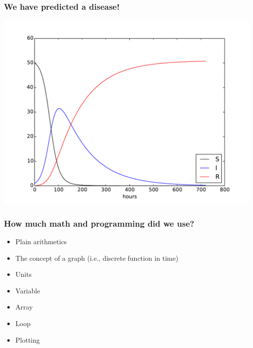 \documentclass{beamer}
\begin{document}
\begin{frame}
\frametitle{We have predicted a disease!}

\begin{center}  %
  \centerline{\includegraphics[width=0.9\linewidth]{fig/SIR1.pdf}}
\end{center}
\end{frame}

\begin{frame}
\frametitle{How much math and programming did we use?}

\begin{itemize}
 \item Plain arithmetics

 \item The concept of a graph (i.e., discrete function in time)

 \item Units

 \item Variable

 \item Array

 \item Loop

 \item Plotting
\end{itemize}

\noindent
\end{frame}
\end{document}
